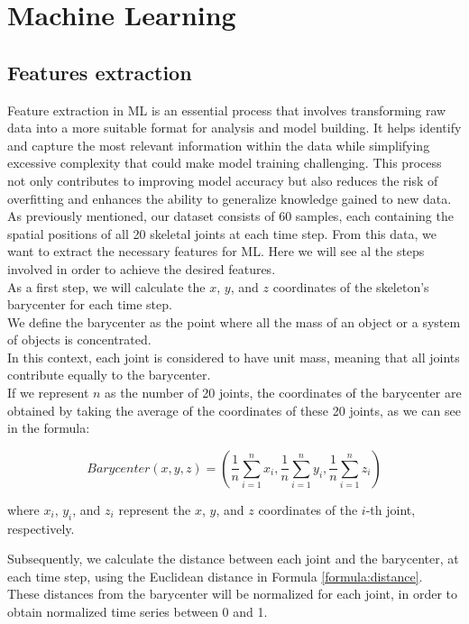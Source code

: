 \chapter{Machine Learning}

\section{Features extraction}
Feature extraction in ML is an essential process that involves transforming raw data into a more suitable format for analysis and model building.
It helps identify and capture the most relevant information within the data while simplifying excessive complexity that could make model training challenging.
This process not only contributes to improving model accuracy but also reduces the risk of overfitting and enhances the ability to generalize knowledge gained to new data. \\
As previously mentioned, our dataset consists of 60 samples, each containing the spatial positions of all 20 skeletal joints at each time step.
From this data, we want to extract the necessary features for ML.
Here we will see al the steps involved in order to achieve the desired features. \\

As a first step, we will calculate the $x$, $y$, and $z$ coordinates of the skeleton's barycenter for each time step. \\
We define the barycenter as the point where all the mass of an object or a system of objects is concentrated. \\
In this context, each joint is considered to have unit mass, meaning that all joints contribute equally to the barycenter. \\
If we represent $n$ as the number of 20 joints, the coordinates of the barycenter are obtained by taking the average of the coordinates of these 20 joints, as we can see in the formula:


\begin{equation}
    \textit{Barycenter} (x, y, z) = \left(\frac{1}{n} \sum_{i=1}^{n} x_i, \frac{1}{n} \sum_{i=1}^{n} y_i, \frac{1}{n} \sum_{i=1}^{n} z_i\right)
    \label{formula:baricentro}
\end{equation}
    
where $x_i$, $y_i$, and $z_i$ represent the $x$, $y$, and $z$ coordinates of the $i$-th joint, respectively.

Subsequently, we calculate the distance between each joint and the barycenter, at each time step, using the Euclidean distance in Formula \ref{formula:distance}. \\
These distances from the barycenter will be normalized for each joint, in order to obtain normalized time series between 0 and 1.

